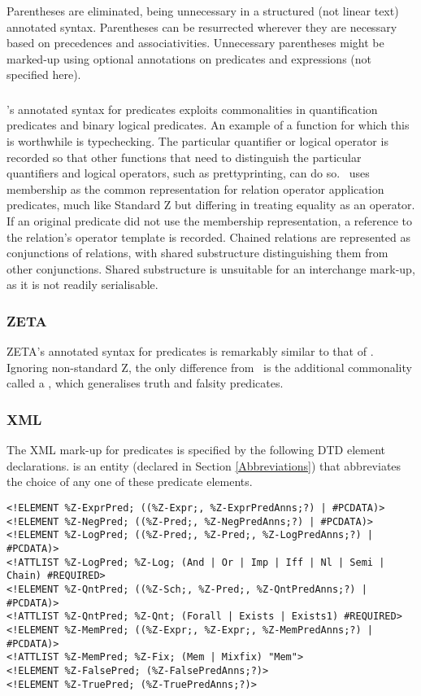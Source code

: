 \documentclass[a4paper,10pt]{article}
\def\Zeta{{\sf Z{\small E}T{\small A}}}
\begin{document}
Parentheses are eliminated, being unnecessary in
a structured (not linear text) annotated syntax.
Parentheses can be resurrected wherever they are necessary
based on precedences and associativities.
Unnecessary parentheses might be marked-up using optional annotations
on predicates and expressions (not specified here).

\subsubsection{\CADiZ}

\CADiZ's annotated syntax for predicates exploits commonalities
in quantification predicates and binary logical predicates.
An example of a function for which this is worthwhile is typechecking.
The particular quantifier or logical operator is recorded
so that other functions that need to distinguish the particular
quantifiers and logical operators, such as prettyprinting, can do so.
\CADiZ\ uses membership as the common representation for
relation operator application predicates,
much like Standard Z but differing in treating equality as an operator.
If an original predicate did not use the membership representation,
a reference to the relation's operator template is recorded.
Chained relations are represented as conjunctions of relations,
with shared substructure distinguishing them from other conjunctions.
Shared substructure is unsuitable for an interchange mark-up,
as it is not readily serialisable.

\subsubsection{\Zeta}

\Zeta's annotated syntax for predicates is remarkably similar
to that of \CADiZ.
Ignoring non-standard Z, the only difference from \CADiZ\ is
the additional commonality called a ,
which generalises truth and falsity predicates.

\subsubsection{XML}

The XML mark-up for predicates is
specified by the following DTD element declarations.
 is an entity (declared in Section \ref{Abbreviations})
that abbreviates the choice of any one of these predicate elements.

\begin{verbatim}
<!ELEMENT %Z-ExprPred; ((%Z-Expr;, %Z-ExprPredAnns;?) | #PCDATA)>
<!ELEMENT %Z-NegPred; ((%Z-Pred;, %Z-NegPredAnns;?) | #PCDATA)>
<!ELEMENT %Z-LogPred; ((%Z-Pred;, %Z-Pred;, %Z-LogPredAnns;?) | #PCDATA)>
<!ATTLIST %Z-LogPred; %Z-Log; (And | Or | Imp | Iff | Nl | Semi | Chain) #REQUIRED>
<!ELEMENT %Z-QntPred; ((%Z-Sch;, %Z-Pred;, %Z-QntPredAnns;?) | #PCDATA)>
<!ATTLIST %Z-QntPred; %Z-Qnt; (Forall | Exists | Exists1) #REQUIRED>
<!ELEMENT %Z-MemPred; ((%Z-Expr;, %Z-Expr;, %Z-MemPredAnns;?) | #PCDATA)>
<!ATTLIST %Z-MemPred; %Z-Fix; (Mem | Mixfix) "Mem">
<!ELEMENT %Z-FalsePred; (%Z-FalsePredAnns;?)>
<!ELEMENT %Z-TruePred; (%Z-TruePredAnns;?)>
\end{verbatim}
\end{document}
